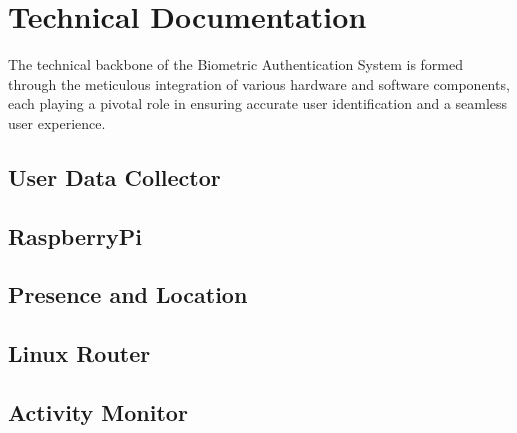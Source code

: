 \documentclass{article}
\begin{document}
\section{Technical Documentation} The technical backbone of the Biometric
Authentication System is formed through the meticulous integration of various
hardware and software components, each playing a pivotal role in ensuring
accurate user identification and a seamless user experience.

\subsection{User Data Collector}

\subsection{RaspberryPi}

\subsection{Presence and Location}

\subsection{Linux Router}

\subsection{Activity Monitor}
\end{document}

